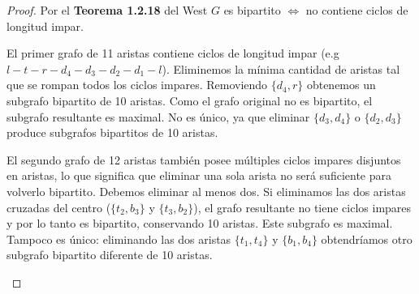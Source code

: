 \begin{proof}
    Por el \textbf{Teorema 1.2.18} del West \( G \) es bipartito \( \iff \) no contiene ciclos de longitud impar.

    El primer grafo de 11 aristas contiene ciclos de longitud impar (e.g \(l-t-r-d_4-d_3-d_2-d_1-l\)). Eliminemos la mínima cantidad de aristas tal que se rompan todos los ciclos impares. Removiendo \( \{d_4, r\} \) obtenemos un subgrafo bipartito de 10 aristas. Como el grafo original no es bipartito, el subgrafo resultante es maximal. No es único, ya que eliminar \( \{d_3, d_4\} \) o \( \{d_2, d_3\} \) produce subgrafos bipartitos de 10 aristas.

    El segundo grafo de 12 aristas también posee múltiples ciclos impares disjuntos en aristas, lo que significa que eliminar una sola arista no será suficiente para volverlo bipartito. Debemos eliminar al menos dos. Si eliminamos las dos aristas cruzadas del centro (\( \{t_2, b_3\} \) y \( \{t_3, b_2\} \)), el grafo resultante no tiene ciclos impares y por lo tanto es bipartito, conservando 10 aristas. Este subgrafo es maximal. Tampoco es único: eliminando las dos aristas \( \{t_1, t_4\} \) y \( \{b_1, b_4\} \) obtendríamos otro subgrafo bipartito diferente de 10 aristas.

    \begin{center}
        \hspace{1.5cm}
\end{center}
\end{proof}
